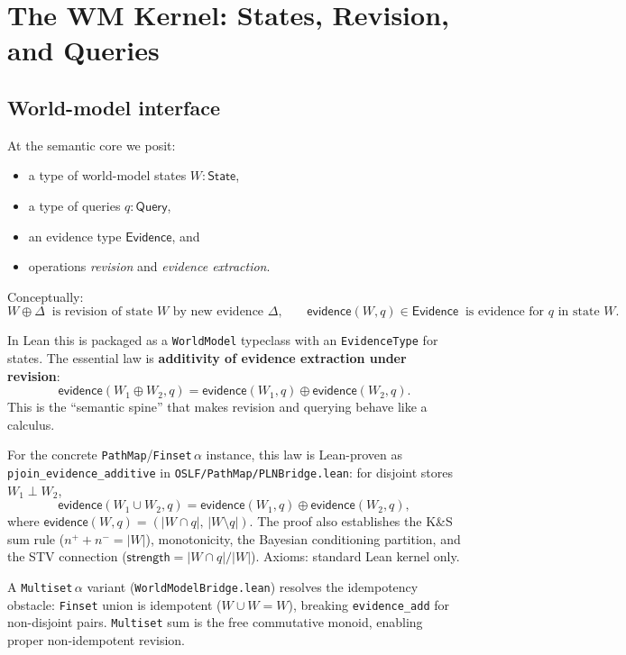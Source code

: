 \documentclass[]{article}
\newcommand{\code}[1]{\texttt{#1}}
\newcommand{\Evidence}{\mathsf{Evidence}}
\newcommand{\State}{\mathsf{State}}
\newcommand{\Query}{\mathsf{Query}}
\newcommand{\revise}{\mathbin{\oplus}}
\newcommand{\Strength}{\mathsf{strength}}
\newcommand{\ev}{\mathsf{evidence}}
\begin{document}
\section{The WM Kernel: States, Revision, and Queries}
\label{sec:kernel}

\subsection{World-model interface}

At the semantic core we posit:
\begin{itemize}[leftmargin=2em]
\item a type of world-model states $W:\State$,
\item a type of queries $q:\Query$,
\item an evidence type $\Evidence$, and
\item operations \emph{revision} and \emph{evidence extraction}.
\end{itemize}

Conceptually:
\[
  W \revise \Delta \;\;\text{is revision of state $W$ by new evidence
  $\Delta$,} \qquad
  \ev(W,q)\in \Evidence \;\;\text{is evidence for $q$ in state $W$.}
\]

In Lean this is packaged as a \code{WorldModel} typeclass with an
\code{EvidenceType} for states. The essential law is \textbf{additivity of
evidence extraction under revision}:
\[
  \ev(W_1 \revise W_2, q) = \ev(W_1,q) \revise \ev(W_2,q).
\]
This is the ``semantic spine'' that makes revision and querying behave like
a calculus.

For the concrete \code{PathMap}/\code{Finset}$\,\alpha$ instance, this law
is Lean-proven as \code{pjoin\_evidence\_additive} in
\code{OSLF/PathMap/PLNBridge.lean}: for disjoint stores $W_1 \perp W_2$,
\[
  \ev(W_1 \cup W_2, q) = \ev(W_1,q) \oplus \ev(W_2,q),
\]
where $\ev(W,q) = (|W \cap q|,\, |W \setminus q|)$. The proof also
establishes the K\&S sum rule ($n^+ + n^- = |W|$), monotonicity, the
Bayesian conditioning partition, and the STV connection
($\Strength = |W\cap q|/|W|$). Axioms: standard Lean kernel only.

A \code{Multiset}$\,\alpha$ variant (\code{WorldModelBridge.lean})
resolves the idempotency obstacle: \code{Finset} union is idempotent
($W \cup W = W$), breaking \code{evidence\_add} for non-disjoint pairs.
\code{Multiset} sum is the free commutative monoid, enabling proper
non-idempotent revision.
\end{document}
